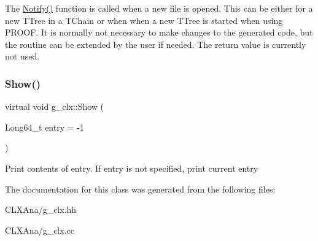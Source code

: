 The \hyperlink{classg__clx_a1fe81316168bc18dc2325ca5595577a9}{Notify()} function is called when a new file is opened. This can be either for a new T\+Tree in a T\+Chain or when when a new T\+Tree is started when using P\+R\+O\+OF. It is normally not necessary to make changes to the generated code, but the routine can be extended by the user if needed. The return value is currently not used. \mbox{\label{classg__clx_ae86183470c7bb8db45753aa4c86f1d41}} 
\subsubsection{\texorpdfstring{Show()}{Show()}}
{\footnotesize\ttfamily virtual void g\+\_\+clx\+::\+Show (\begin{DoxyParamCaption}\item[{Long64\+\_\+t}]{entry = {\ttfamily -\/1} }\end{DoxyParamCaption})\hspace{0.3cm}{\ttfamily [virtual]}}

Print contents of entry. If entry is not specified, print current entry 

The documentation for this class was generated from the following files\+:\begin{DoxyCompactItemize}
\item 
C\+L\+X\+Ana/g\+\_\+clx.\+hh\item 
C\+L\+X\+Ana/g\+\_\+clx.\+cc\end{DoxyCompactItemize}
